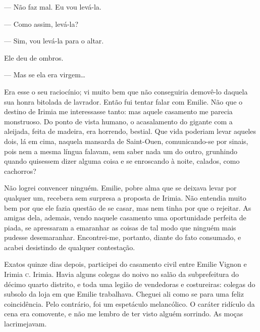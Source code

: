 
--- Não faz mal. Eu vou levá-la.

--- Como assim, levá-la?

--- Sim, vou levá-la para o altar.




Ele deu de ombros.

--- Mas se ela era virgem\ldots{}

Era esse o seu raciocínio; vi muito bem que não conseguiria demovê-lo
daquela sua honra bitolada de lavrador. Então fui tentar falar com
Emilie. Não que o destino de Irimia me interessasse tanto: mas aquele
casamento me parecia monstruoso. Do ponto de vista humano, o
acasalamento do gigante com a aleijada, feita de madeira, era horrendo,
bestial. Que vida poderiam levar aqueles dois, lá em cima, naquela
mansarda de Saint-Ouen, comunicando-se por sinais, pois nem a mesma
língua falavam, sem saber nada um do outro, grunhindo quando quisessem
dizer alguma coisa e se enroscando à noite, calados, como cachorros?

Não logrei convencer ninguém. Emilie, pobre alma que se deixava levar
por qualquer um, recebera sem surpresa a proposta de Irimia. Não
entendia muito bem por que ele fazia questão de se casar, mas nem tinha
por que o rejeitar. As amigas dela, ademais, vendo naquele casamento uma
oportunidade perfeita de piada, se apressaram a emaranhar as coisas de
tal modo que ninguém mais pudesse desemaranhar. Encontrei-me, portanto,
diante do fato consumado, e acabei desistindo de qualquer contestação.

Exatos quinze dias depois, participei do casamento civil entre Emilie
Vignon e Irimia \textsc{c}. Irimia. Havia alguns colegas do noivo no salão da
subprefeitura do décimo quarto distrito, e toda uma legião de vendedoras
e costureiras: colegas do subsolo da loja em que Emilie trabalhava.
Cheguei ali como se para uma feliz coincidência. Pelo contrário, foi um
espetáculo melancólico. O caráter ridículo da cena era comovente, e não
me lembro de ter visto alguém sorrindo. As moças lacrimejavam.

